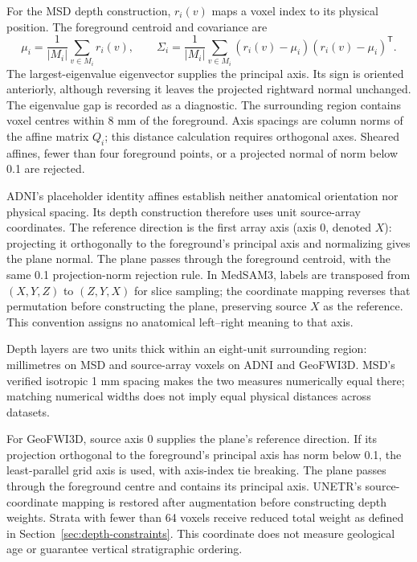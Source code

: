 \documentclass[12pt,a4paper]{article}
\begin{document}
For the MSD depth construction, $r_i(v)$ maps a voxel index to its
physical position. The foreground centroid and covariance are
\begin{equation}
\mu_i=\frac{1}{|M_i|}\sum_{v\in M_i}r_i(v),\qquad
\Sigma_i=\frac{1}{|M_i|}\sum_{v\in M_i}
(r_i(v)-\mu_i)(r_i(v)-\mu_i)^{\mathsf T}.
\label{eq:depth-centroid-covariance}
\end{equation}
The largest-eigenvalue eigenvector supplies the principal axis. Its
sign is oriented anteriorly, although reversing it leaves the projected
rightward normal unchanged. The eigenvalue gap is recorded as a
diagnostic. The surrounding region contains voxel centres within
8 mm of the foreground. Axis spacings are column norms of the affine
matrix $Q_i$; this distance calculation requires orthogonal axes.
Sheared affines, fewer than four foreground points, or a projected
normal of norm below 0.1 are rejected.

ADNI's placeholder identity affines establish neither anatomical
orientation nor physical spacing. Its depth construction therefore uses
unit source-array coordinates. The reference direction is the first
array axis (axis 0, denoted $X$): projecting it orthogonally to the
foreground's principal axis and normalizing gives the plane normal.
The plane passes through the foreground centroid, with the same 0.1
projection-norm rejection rule. In MedSAM3, labels are transposed from
$(X,Y,Z)$ to $(Z,Y,X)$ for slice sampling; the coordinate mapping
reverses that permutation before constructing the plane, preserving
source $X$ as the reference. This convention assigns no anatomical
left--right meaning to that axis.

Depth layers are two units thick within an eight-unit surrounding region:
millimetres on MSD and source-array voxels on ADNI and GeoFWI3D. MSD's
verified isotropic 1 mm spacing makes the two measures numerically equal
there; matching numerical widths does not imply equal physical distances
across datasets.

For GeoFWI3D, source axis 0 supplies the plane's reference direction.
If its projection orthogonal to the foreground's principal axis has norm
below 0.1, the least-parallel grid axis is used, with axis-index tie
breaking. The plane passes through the foreground centre and contains
its principal axis. UNETR's source-coordinate mapping is restored after
augmentation before constructing depth weights. Strata with fewer than
64 voxels receive reduced total weight as defined in
Section~\ref{sec:depth-constraints}. This coordinate does not measure
geological age or guarantee vertical stratigraphic ordering.
\end{document}
